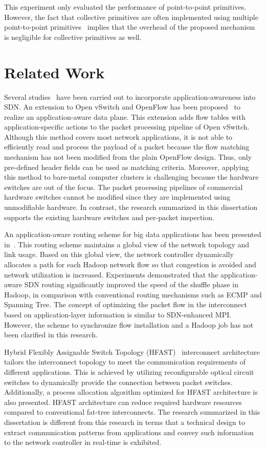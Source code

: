 This experiment only evaluated the performance of point-to-point
primitives. However, the fact that collective primitives are often
implemented using multiple point-to-point
primitives~\autocite{Squyres2005,mvapich} implies that the overhead of the
proposed mechanism is negligible for collective primitives as well.

\section{Related Work}\label{sec:iv-related-work}

Several studies~\autocite{Mekky2014,Cheng2014} have been carried out
to incorporate application-awareness into SDN\@. An extension to Open
vSwitch and OpenFlow has been proposed~\autocite{Mekky2014} to realize
an application-aware data plane. This extension adds flow tables with
application-specific actions to the packet processing pipeline of Open
vSwitch. Although this method covers most network applications, it is
not able to efficiently read and process the payload of a packet because
the flow matching mechanism has not been modified from the plain
OpenFlow design. Thus, only pre-defined header fields can be used as
matching criteria. Moreover, applying this method to bare-metal computer
clusters is challenging because the hardware switches are out of the
focus. The packet processing pipelines of commercial hardware switches
cannot be modified since they are implemented using unmodifiable
hardware. In contrast, the research summarized in this dissertation supports
the existing hardware switches and per-packet inspection.

An application-aware routing scheme for big data applications has been
presented in~\autocite{Cheng2014}. This routing scheme maintains a
global view of the network topology and link usage. Based on this global
view, the network controller dynamically allocates a path for each
Hadoop network flow so that congestion is avoided and network
utilization is increased. Experiments demonstrated that the
application-aware SDN routing significantly improved the speed of the
shuffle phase in Hadoop, in comparison with conventional routing
mechanisms such as ECMP and Spanning Tree. The concept of optimizing the
packet flow in the interconnect based on application-layer information
is similar to SDN-enhanced MPI\@. However, the scheme to synchronize flow
installation and a Hadoop job has not been clarified in this research.

Hybrid Flexibly Assignable Switch Topology (HFAST)~\autocite{Kamil2007}
interconnect architecture tailors the interconnect topology to meet the
communication requirements of different applications. This is achieved
by utilizing reconfigurable optical circuit switches to dynamically
provide the connection between packet switches. Additionally, a process
allocation algorithm optimized for HFAST architecture is also presented.
HFAST architecture can reduce required hardware resources compared to
conventional fat-tree interconnects. The research summarized in this
dissertation is different from this research in terms that a technical design
to extract communication patterns from applications and convey such
information to the network controller in real-time is exhibited.

